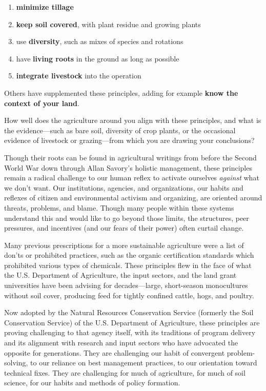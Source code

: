 \documentclass[11pt,letterpaper,twoside,onecolumn]{memoir}
\begin{document}
\begin{enumerate}
\item\textbf{ minimize tillage}
\item \textbf{keep soil covered}, with plant residue and growing plants
\item use \textbf{diversity}, such as mixes of species and rotations
\item have \textbf{living roots} in the ground as long as possible
\item \textbf{integrate livestock} into the operation
\end{enumerate}

Others have supplemented these principles, adding for example \textbf{know the context of your land}. 

How well does the agriculture around you align with these principles, and what is the evidence---such as bare soil, diversity of crop plants, or the occasional evidence of livestock or grazing---from which you are drawing your conclusions?

Though their roots can be found in agricultural writings from before the Second World War down through Allan Savory's holistic management, these principles remain a radical challenge to our human reflex to activate ourselves \textit{against} what we don't want. Our institutions, agencies, and organizations, our habits and reflexes of citizen and environmental activism and organizing, are oriented around threats, problems, and blame. Though many people within these systems understand this and would like to go beyond those limits, the structures, peer pressures, and incentives (and our fears of their power) often curtail change.

Many previous prescriptions for a more sustainable agriculture were a list of don'ts or prohibited practices, such as the organic certification standards which prohibited various types of chemicals. These principles flew in the face of what the U.S. Department of Agriculture, the input sectors, and the land grant universities have been advising for decades---large, short-season monocultures without soil cover, producing feed for tightly confined cattle, hogs, and poultry. 

Now adopted by the Natural Resources Conservation Service (formerly the Soil Conservation Service) of the U.S. Department of Agriculture, these principles are proving challenging to that agency itself, with its traditions of program delivery and its alignment with research and input sectors who have advocated the opposite for generations. They are challenging our habit of convergent problem-solving, to our reliance on best management practices, to our orientation toward technical fixes. They are challenging for much of agriculture, for much of soil science, for our habits and methods of policy formation. 
\end{document}
